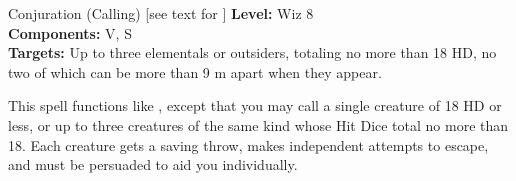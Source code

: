 {Conjuration (Calling) [see text for ]}
{
	\textbf{Level:}
	Wiz 8\\
	\textbf{Components:}
	V, S\\
	\textbf{Targets:}
	Up to three elementals or outsiders, totaling no more than 18 HD, no two of which can be more than 9 m apart when they appear.\\
}
{
	This spell functions like , except that you may call a single creature of 18 HD or less, or up to three creatures of the same kind whose Hit Dice total no more than 18. Each creature gets a saving throw, makes independent attempts to escape, and must be persuaded to aid you individually.

}

